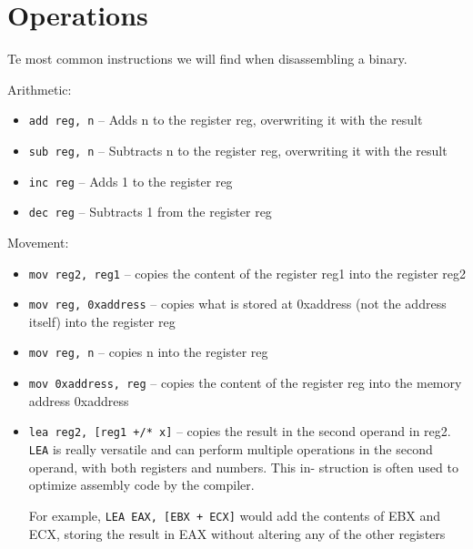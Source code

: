 \documentclass[]{project_plan}
\begin{document}
\section{Operations}
Te most common instructions we will find when disassembling a binary.

Arithmetic:
\begin{itemize}
  \item \lstinline|add reg, n| – Adds n to the register reg, overwriting it with the result
  \item \lstinline|sub reg, n| – Subtracts n to the register reg, overwriting it with the result
  \item \lstinline|inc reg| – Adds 1 to the register reg
  \item \lstinline|dec reg| – Subtracts 1 from the register reg
\end{itemize}

Movement:
\begin{itemize}
  \item \lstinline|mov reg2, reg1| – copies the content of the register reg1 into the register reg2
  \item \lstinline|mov reg, 0xaddress| – copies what is stored at 0xaddress (not the address itself) into the register reg
  \item \lstinline|mov reg, n| – copies n into the register reg
  \item \lstinline|mov 0xaddress, reg| – copies the content of the register reg into the
        memory address 0xaddress
  \item \lstinline|lea reg2, [reg1 +/* x]| – copies the result in the second operand
        in reg2. \lstinline|LEA| is really versatile and can perform multiple operations
        in the second operand, with both registers and numbers. This in-
        struction is often used to optimize assembly code by the compiler.

        For example, \lstinline|LEA EAX, [EBX + ECX]| would add the contents of EBX
        and ECX, storing the result in EAX without altering any of the other
        registers
\end{itemize}
\end{document}
